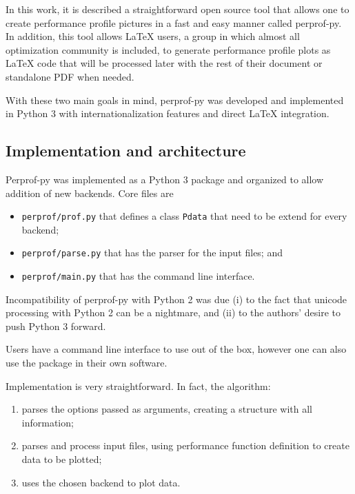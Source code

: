     In this work, it is described a straightforward open source tool that
    allows  one to create  performance profile pictures in a fast and easy
    manner called perprof-py.
    In addition, this tool  allows LaTeX users, a group in which almost
    all optimization community is included, to generate performance profile
    plots as LaTeX code that will be processed later  with the rest of their document 
    or standalone PDF when needed.

    With these two main goals in mind,  perprof-py was developed and 
    implemented in Python 3 with internationalization features and direct LaTeX
    integration.

\subsection*{Implementation and architecture}

    Perprof-py was implemented as a Python 3 package
    and organized to allow addition of new backends.
    Core files are
    \begin{itemize}
      \item {\tt perprof/prof.py} that defines a class {\tt Pdata} that need to
        be extend for every backend;
      \item {\tt perprof/parse.py} that has the parser for the input files; and
      \item {\tt perprof/main.py} that has the command line interface.
    \end{itemize}

    Incompatibility of perprof-py  with Python 2
    was due (i) to the fact that unicode processing with Python 2 can be a
    nightmare, and
    (ii) to the authors' desire to push Python 3 forward.

    Users have a command line interface to use out of the box,
    however one can also use the package in their own software.

    Implementation is very straightforward. In fact, the algorithm:
    \begin{enumerate}
      \item parses the options passed as arguments, creating a
        structure with all  information;
      \item parses and process  input files, using  
         performance function definition to create  data to be plotted;
      \item uses the chosen backend to plot  data.
    \end{enumerate}

